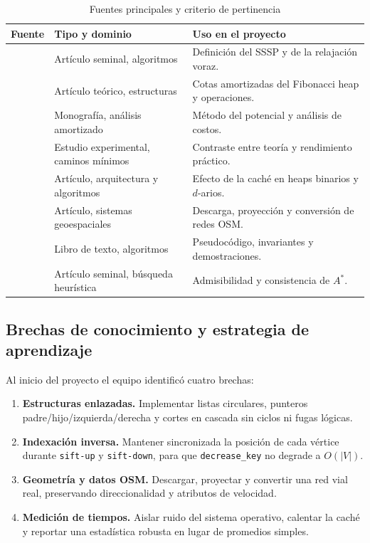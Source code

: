 \begin{table}[H]
    \centering
    \fontsize{9.5}{11.5}\selectfont
    \renewcommand{\arraystretch}{1.15}
    \caption{Fuentes principales y criterio de pertinencia}
    \label{tab:criterios_fuentes}
    \begin{tabularx}{\textwidth}{@{}>{\raggedright\arraybackslash}p{3.5cm} >{\raggedright\arraybackslash}p{3.9cm} >{\raggedright\arraybackslash}X@{}}
        \toprule
        \textbf{Fuente} & \textbf{Tipo y dominio} & \textbf{Uso en el proyecto} \\
        \midrule
        \textcite{dijkstra1959note} & Artículo seminal, algoritmos & Definición del SSSP y de la relajación voraz. \\
        \textcite{fredman1987fibonacci} & Artículo teórico, estructuras & Cotas amortizadas del Fibonacci heap y operaciones. \\
        \textcite{tarjan1983data} & Monografía, análisis amortizado & Método del potencial y análisis de costos. \\
        \textcite{cherkassky1996shortest} & Estudio experimental, caminos mínimos & Contraste entre teoría y rendimiento práctico. \\
        \textcite{lamarca1996cache} & Artículo, arquitectura y algoritmos & Efecto de la caché en heaps binarios y $d$-arios. \\
        \textcite{boeing2017osmnx} & Artículo, sistemas geoespaciales & Descarga, proyección y conversión de redes OSM. \\
        \textcite{cormen2022introduction} & Libro de texto, algoritmos & Pseudocódigo, invariantes y demostraciones. \\
        \textcite{hart1968formal} & Artículo seminal, búsqueda heurística & Admisibilidad y consistencia de $A^*$. \\
        \bottomrule
    \end{tabularx}
\end{table}

\subsection{Brechas de conocimiento y estrategia de aprendizaje}
Al inicio del proyecto el equipo identificó cuatro brechas:
\begin{enumerate}
    \item \textbf{Estructuras enlazadas.} Implementar listas circulares, punteros padre/hijo/izquierda/derecha y cortes en cascada sin ciclos ni fugas lógicas.
    \item \textbf{Indexación inversa.} Mantener sincronizada la posición de cada vértice durante \texttt{sift-up} y \texttt{sift-down}, para que \texttt{decrease\_key} no degrade a $O(|V|)$.
    \item \textbf{Geometría y datos OSM.} Descargar, proyectar y convertir una red vial real, preservando direccionalidad y atributos de velocidad.
    \item \textbf{Medición de tiempos.} Aislar ruido del sistema operativo, calentar la caché y reportar una estadística robusta en lugar de promedios simples.
\end{enumerate}

